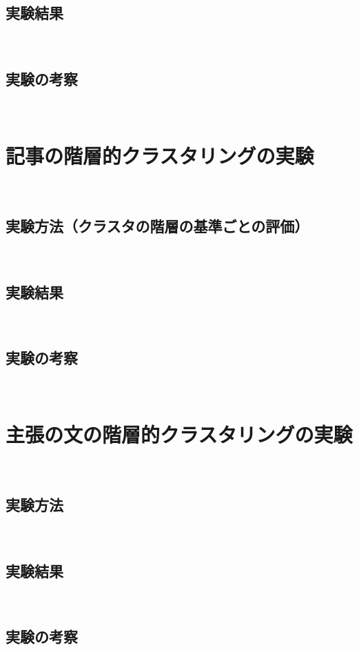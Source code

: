\documentclass[12pt,a4j]{jreport}
\begin{document}
\subsection{実験結果}
~

\subsection{実験の考察}
~

\section{記事の階層的クラスタリングの実験}
\label{section_article_clustering_experiment}
~

\subsection{実験方法（クラスタの階層の基準ごとの評価）}
~

\subsection{実験結果}
~

\subsection{実験の考察}
~

\section{主張の文の階層的クラスタリングの実験}
\label{section_sentence_clustering_experiment}
~

\subsection{実験方法}
~

\subsection{実験結果}
~

\subsection{実験の考察}
~


\end{document}
